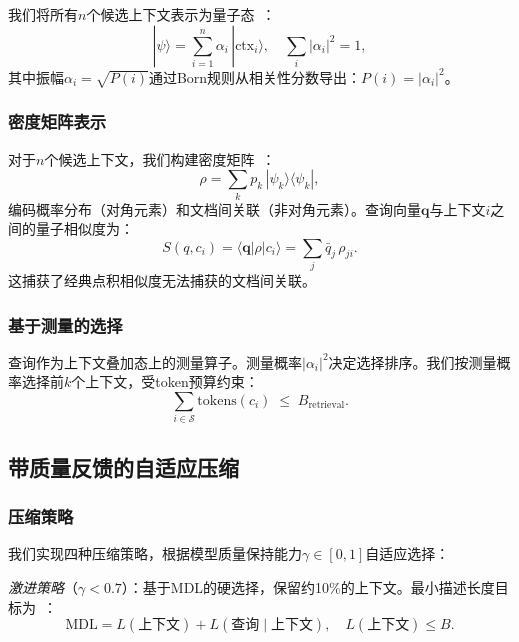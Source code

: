 \documentclass[journal]{IEEEtran}
\newcommand{\abs}[1]{\left|#1\right|}
\newcommand{\ket}[1]{|#1\rangle}
\newcommand{\bra}[1]{\langle #1|}
\begin{document}
我们将所有$n$个候选上下文表示为量子态~\cite{vanrijsbergen2004}：
\begin{equation}
  \ket{\psi} = \sum_{i=1}^{n} \alpha_i\, \ket{\mathrm{ctx}_i},
  \quad
  \sum_{i} \abs{\alpha_i}^{2} = 1,
  \label{eq:superposition}
\end{equation}
其中振幅$\alpha_i = \sqrt{P(i)}$通过Born规则从相关性分数导出：$P(i) = \abs{\alpha_i}^{2}$。

\subsubsection{密度矩阵表示}

对于$n$个候选上下文，我们构建密度矩阵~\cite{zuccon2009}：
\begin{equation}
  \rho = \sum_{k} p_k\, \ket{\psi_k}\bra{\psi_k},
  \label{eq:density}
\end{equation}
编码概率分布（对角元素）和文档间关联（非对角元素）。查询向量$\mathbf{q}$与上下文$i$之间的量子相似度为：
\begin{equation}
  S(q, c_i) = \bra{\mathbf{q}}\rho\ket{c_i}
            = \sum_{j} \bar{q}_j\, \rho_{ji}.
  \label{eq:qsim}
\end{equation}
这捕获了经典点积相似度无法捕获的文档间关联。

\subsubsection{基于测量的选择}

查询作为上下文叠加态上的测量算子。测量概率$\abs{\alpha_i}^{2}$决定选择排序。我们按测量概率选择前$k$个上下文，受token预算约束：
\begin{equation}
  \sum_{i \in \mathcal{S}}
    \mathrm{tokens}(c_i) \;\leq\; B_{\mathrm{retrieval}}.
  \label{eq:budget-constraint}
\end{equation}

\subsection{带质量反馈的自适应压缩}
\label{sec:compression}

\subsubsection{压缩策略}

我们实现四种压缩策略，根据模型质量保持能力$\gamma \in [0,1]$自适应选择：

\emph{激进策略}（$\gamma < 0.7$）：基于MDL的硬选择，保留约10\%的上下文。最小描述长度目标为~\cite{grunwald2007mdl}：
\begin{equation}
  \mathrm{MDL} = L(\text{上下文}) + L(\text{查询} \mid \text{上下文}),
  \quad L(\text{上下文}) \leq B.
  \label{eq:mdl}
\end{equation}
\end{document}
